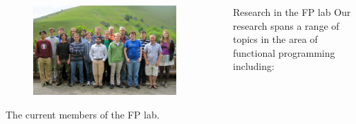 \documentclass[final]{beamer}
\newlength{\sepwid}
\newlength{\onecolwid}
\newcommand{\vsp}{\vspace*{2cm}}
\newcommand{\uuxb}[1]{\textcolor{uuxblue}{#1}}
\begin{document}
\begin{frame}[t]
\begin{columns}[t]
\begin{column}{\onecolwid}
\vsp
\begin{figure}%
\includegraphics[width=\onecolwid]{FP-LAB-2013.jpg}%
\end{figure}
\begin{center}\vspace{-0.5cm}
	The current members of the FP lab. 
\end{center}
\vsp





\end{column}













\begin{column}{\sepwid}\end{column}			%


\begin{column}{\onecolwid}


\begin{block}{Research in the FP lab}
Our research spans a range of topics in the area of \uuxb{functional programming} including:



\end{block}
\end{column}
\end{columns}
\end{frame}
\end{document}
